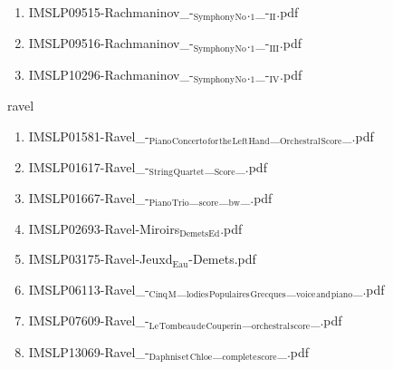 \documentclass[11pt]{article}
\begin{document}
\begin{enumerate}
\begin{enumerate}
\item IMSLP09515-Rachmaninov\_-$_{\text{Symphony}}$$_{\text{No}}$.$_{\text{1}}$\_-$_{\text{II}}$.pdf
\label{sec-1-1-1-1-44-53-5-2}

\item IMSLP09516-Rachmaninov\_-$_{\text{Symphony}}$$_{\text{No}}$.$_{\text{1}}$\_-$_{\text{III}}$.pdf
\label{sec-1-1-1-1-44-53-5-3}

\item IMSLP10296-Rachmaninov\_-$_{\text{Symphony}}$$_{\text{No}}$.$_{\text{1}}$\_-$_{\text{IV}}$.pdf
\label{sec-1-1-1-1-44-53-5-4}
\end{enumerate}
\end{enumerate}

\item ravel
\label{sec-1-1-1-1-44-54}
\begin{enumerate}
\item IMSLP01581-Ravel\_-$_{\text{Piano}}$$_{\text{Concerto}}$$_{\text{for}}$$_{\text{the}}$$_{\text{Left}}$$_{\text{Hand}}$\_$_{\text{Orchestral}}$$_{\text{Score}}$\_.pdf
\label{sec-1-1-1-1-44-54-1}

\item IMSLP01617-Ravel\_-$_{\text{String}}$$_{\text{Quartet}}$\_$_{\text{Score}}$\_.pdf
\label{sec-1-1-1-1-44-54-2}

\item IMSLP01667-Ravel\_-$_{\text{Piano}}$$_{\text{Trio}}$\_$_{\text{score}}$\_$_{\text{bw}}$\_.pdf
\label{sec-1-1-1-1-44-54-3}

\item IMSLP02693-Ravel-Miroirs$_{\text{DemetsEd}}$.pdf
\label{sec-1-1-1-1-44-54-4}

\item IMSLP03175-Ravel-Jeuxd$_{\text{Eau}}$-Demets.pdf
\label{sec-1-1-1-1-44-54-5}

\item IMSLP06113-Ravel\_-$_{\text{Cinq}}$$_{\text{M}}$\_$_{\text{lodies}}$$_{\text{Populaires}}$$_{\text{Grecques}}$\_$_{\text{voice}}$$_{\text{and}}$$_{\text{piano}}$\_.pdf
\label{sec-1-1-1-1-44-54-6}

\item IMSLP07609-Ravel\_-$_{\text{Le}}$$_{\text{Tombeau}}$$_{\text{de}}$$_{\text{Couperin}}$\_$_{\text{orchestral}}$$_{\text{score}}$\_.pdf
\label{sec-1-1-1-1-44-54-7}

\item IMSLP13069-Ravel\_-$_{\text{Daphnis}}$$_{\text{et}}$$_{\text{Chloe}}$\_$_{\text{complete}}$$_{\text{score}}$\_.pdf
\label{sec-1-1-1-1-44-54-8}


\end{enumerate}
\end{document}
